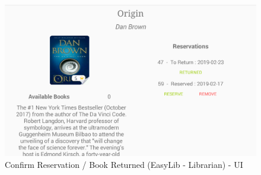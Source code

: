 \begin{figure}[H]
	\hspace{0.5cm}
	\includegraphics[scale=0.2]{Images/UI/Librarian/2}
	\caption{Confirm Reservation / Book Returned (EasyLib - Librarian) - UI}
\end{figure}